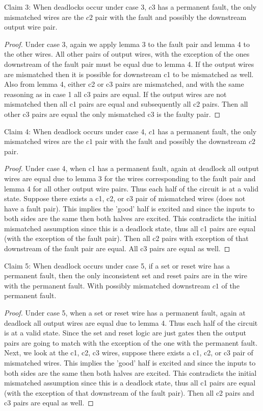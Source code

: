 \documentclass{article}
\begin{document}
Claim 3:  When deadlocks occur under case 3, $c3$ has a permanent fault, the only mismatched wires are the $c2$ pair with the fault and possibly the downstream output wire pair.
\begin{proof}
Under case 3, again we apply lemma 3 to the fault pair and lemma 4 to the other wires.  All other pairs of output wires, with the exception of the ones downstream of the fault pair must be equal due to lemma 4.  If the output wires are mismatched then it is possible for downstream c1 to be mismatched as well.  Also from lemma 4, either c2 or c3 pairs are mismatched, and with the same reasoning as in case 1 all c3 pairs are equal.  If the output wires are not mismatched then all c1 pairs are equal and subsequently all c2 pairs.  Then all other c3 pairs are equal the only mismatched c3 is the faulty pair. \newline
\end{proof}
Claim 4:  When deadlock occurs under case 4, $c1$ has a permanent fault, the only mismatched wires are the $c1$ pair with the fault and possibly the downstream $c2$ pair.
\begin{proof}
Under case 4, when c1 has a permanent fault, again at deadlock all output wires are equal due to lemma 3 for the wires corresponding to the fault pair and lemma 4 for all other output wire pairs.  Thus each half of the circuit is at a valid state.  Suppose there exists a c1, c2, or c3 pair of mismatched wires (does not have a fault pair).  This implies the 'good' half is excited and since the inputs to both sides are the same then both halves are excited.  This contradicts the initial mismatched assumption since this is a deadlock state, thus all c1 pairs are equal (with the exception of the fault pair).  Then all c2 pairs with exception of that downstream of the fault pair are equal.  All c3 pairs are equal as well. \newline
\end{proof}
Claim 5:  When deadlock occurs under case 5, if a set or reset wire has a permanent fault, then the only inconsistent set and reset pairs are in the wire with the permanent fault.  With possibly mismatched downstream $c1$ of the permanent fault.
\begin{proof}
Under case 5, when a set or reset wire has a permanent fault, again at deadlock all output wires are equal due to lemma 4.  Thus each half of the circuit is at a valid state.  Since the set and reset logic are just gates then the output pairs are going to match with the exception of the one with the permanent fault.  Next, we look at the c1, c2, c3 wires, suppose there exists a c1, c2, or c3 pair of mismatched wires.  This implies the 'good' half is excited and since the inputs to both sides are the same then both halves are excited.  This contradicts the initial mismatched assumption since this is a deadlock state, thus all c1 pairs are equal (with the exception of that downstream of the fault pair).  Then all c2 pairs and c3 pairs are equal as well. \newline
\end{proof}
  
\end{document}
